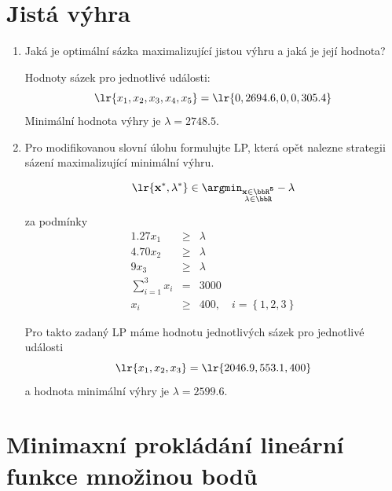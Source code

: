 \section{Jistá výhra}

\begin{enumerate}
    \item Jaká je optimální sázka maximalizující jistou výhru a jaká je její hodnota?

    Hodnoty sázek pro jednotlivé události:
    \[ \lr{x_1, x_2, x_3, x_4, x_5} = \lr{0, 2694.6, 0, 0, 305.4} \]
    Minimální hodnota výhry je \( \lambda = 2748.5 \).

    \item Pro modifikovanou slovní úlohu formulujte LP, která opět nalezne strategii sázení maximalizující minimální výhru.

    \[ \lr{\bf{x}^*, \lambda^*} \in \argmin_{\substack{\bf{x} \in \bbR^5 \\ \lambda \in \bbR}} - \lambda \]

    za podmínky
    \[
    \begin{array}{rcl}
        1.27 x_1 & \geq & \lambda \\
        4.70 x_2 & \geq & \lambda \\
        9 x_3 & \geq & \lambda \\
        \displaystyle \sum_{i = 1}^3 x_i & = & 3000 \\
        x_i & \geq & 400, \quad i = \left\{ 1, 2, 3 \right\}
    \end{array}
    \]

    Pro takto zadaný LP máme hodnotu jednotlivých sázek pro jednotlivé události
    \[ \lr{x_1, x_2, x_3} = \lr{2046.9, 553.1, 400} \]
    a hodnota minimální výhry je \( \lambda = 2599.6 \).
    
\end{enumerate}

\section{Minimaxní prokládání lineární funkce množinou bodů}

